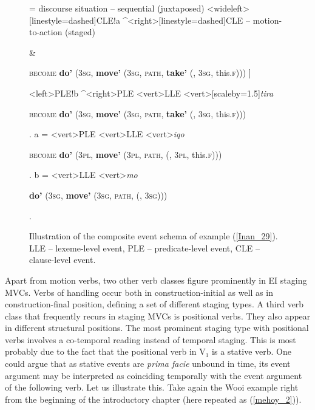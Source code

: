 {\begin{figure}
\jtree[xunit=7.5em,yunit=2em]
\! = {discourse situation -- sequential (juxtaposed)}
<wideleft>[linestyle=dashed]{CLE}!a ^<right>[linestyle=dashed]{CLE -- motion-to-action (staged)}{\begin{scriptsize} [ \textbf{do'} (3\textsc{sg}, \textbf{move'} (3\textsc{sg}, \textsc{path}, \textbf{\rnode{D1}{come'}} (\rnode{B1}{e$_2$}, 3\textsc{sg})))\end{scriptsize} \&}
{\begin{scriptsize} \textsc{become} \textbf{do'} (3\textsc{sg}, \textbf{move'} (3\textsc{sg}, \textsc{path}, \textbf{take'} (, 3\textsc{sg}, this.\textsc{f}))) ]\end{scriptsize}}
<left>{PLE}!b ^<right>{PLE}
<vert>{LLE}
<vert>[scaleby=1.5]{\textit{tira}}{\begin{scriptsize} \textsc{become} \textbf{do'} (3\textsc{sg}, \textbf{move'} (3\textsc{sg}, \textsc{path}, \textbf{take'} (, 3\textsc{sg}, this.\textsc{f})))\end{scriptsize}}.
\!a = <vert>{PLE}
<vert>{LLE}
<vert>{\textit{iqo}}
{\begin{scriptsize} \textsc{become} \textbf{do'} (3\textsc{pl}, \textbf{move'} (3\textsc{pl}, \textsc{path}, \textbf{} (, 3\textsc{pl}, this.\textsc{f})))\end{scriptsize}}.
\!b = <vert>{LLE}
<vert>{\textit{mo}}
{\begin{scriptsize} \textbf{do'} (3\textsc{sg}, \textbf{move'} (3\textsc{sg}, \textsc{path}, \textbf{} (, 3\textsc{sg})))\end{scriptsize}}.
\endjtree

\caption[Event schema illustration of example (\ref{Inan_29})]{Illustration of the composite event schema of example (\ref{Inan_29}). LLE -- lexeme-level event, PLE -- predicate-level event, CLE -- clause-level event.}
\label{figure:eventschema_Inan29}
\end{figure}

Apart from motion verbs, two other verb classes figure prominently in EI staging MVCs. Verbs of handling occur both in construction-initial as well as in construction-final position, defining a set of different staging types. A third verb class that frequently recurs in staging MVCs is positional verbs. They also appear in different structural positions. The most prominent staging type with positional verbs involves a co-temporal reading instead of temporal staging. This is most probably due to the fact that the positional verb in V$_1$ is a stative verb. One could argue that as stative events are \textit{prima facie} unbound in time, its event argument may be interpreted as coinciding temporally with the event argument of the following verb. Let us illustrate this. Take again the Wooi example right from the beginning of the introductory chapter (here repeated as (\ref{mehoy_2})).

}
